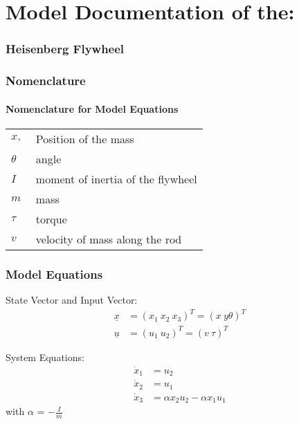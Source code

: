 \documentclass[10pt,a4paper]{article}
\begin{document}
	\part*{Model Documentation of the:}
	\section*{Heisenberg Flywheel} %
	
	
	\section{Nomenclature} %
	\subsection{Nomenclature for Model Equations} %
	
	\begin{tabular}{ll}
		$x, ~$ & Position of the mass \\
		$\theta$ & angle \\
		$I$ & moment of inertia of the flywheel \\
		$m$ & mass \\
		$\tau$ & torque \\
		$v$ & velocity of mass along the rod	
	\end{tabular}

	
	
	\section{Model Equations} %
	
	State Vector and Input Vector:
	\begin{align*}
		\underline{x} &= (x_1 \ x_2 \ x_3)^T = (x \ y \theta )^T \\
		\underline{u} &= (u_1 \ u_2)^T = (v \ \tau)^T
	\end{align*}
	
	\noindent System Equations:	
	\begin{subequations}
	\begin{align}
		\dot{x}_1 &= u_2 \\ 
		\dot{x}_2 &=  u_1	\\
		\dot{x}_3 &= \alpha x_2 u_2 - \alpha x_1 u_1   
	\end{align}
	\end{subequations}
	with $\alpha$ = $-\frac{I}{m}$
	\\
\end{document}
